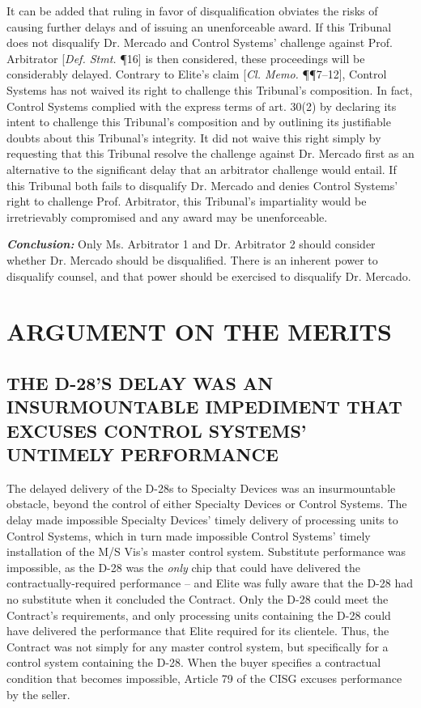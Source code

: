 It can be added that ruling in favor of disqualification obviates the risks of causing further delays and of issuing an unenforceable award. If this Tribunal does not disqualify Dr. Mercado and Control Systems' challenge against Prof. Arbitrator [\textit{Def. Stmt.} \P 16] is then considered, these proceedings will be considerably delayed. Contrary to Elite's claim [\textit{Cl. Memo.} \P\P 7--12], Control Systems has not waived its right to challenge this Tribunal's composition. In fact, Control Systems complied with the express terms of \cite{CIETAC Rules} art. 30(2) by declaring its intent to challenge this Tribunal's composition and by outlining its justifiable doubts about this Tribunal's integrity. It did not waive this right simply by requesting that this Tribunal resolve the challenge against Dr. Mercado first as an alternative to the significant delay that an arbitrator challenge would entail. If this Tribunal both fails to disqualify Dr. Mercado and denies Control Systems' right to challenge Prof. Arbitrator, this Tribunal's impartiality would be irretrievably compromised and any award may be unenforceable.

\textit{\textbf{Conclusion:}} Only Ms. Arbitrator 1 and Dr. Arbitrator 2 should consider whether Dr. Mercado should be disqualified. There is an inherent power to disqualify counsel, and that power should be exercised to disqualify Dr. Mercado.

\section{ARGUMENT ON THE MERITS}

\subsection{THE D-28'S DELAY WAS AN INSURMOUNTABLE IMPEDIMENT THAT EXCUSES CONTROL SYSTEMS' UNTIMELY PERFORMANCE} 

The delayed delivery of the D-28s to Specialty Devices was an insurmountable obstacle, beyond the control of either Specialty Devices or Control Systems. The delay made impossible Specialty Devices' timely delivery of processing units to Control Systems, which in turn made impossible Control Systems' timely installation of the M/S Vis's master control system. Substitute performance was impossible, as the D-28 was the \textit{only} chip that could have delivered the contractually-required performance -- and Elite was fully aware that the D-28 had no substitute when it concluded the Contract. Only the D-28 could meet the Contract's requirements, and only processing units containing the D-28 could have delivered the performance that Elite required for its clientele. Thus, the Contract was not simply for any master control system, but specifically for a control system containing the D-28. When the buyer specifies a contractual condition that becomes impossible, Article 79 of the CISG excuses performance by the seller.

